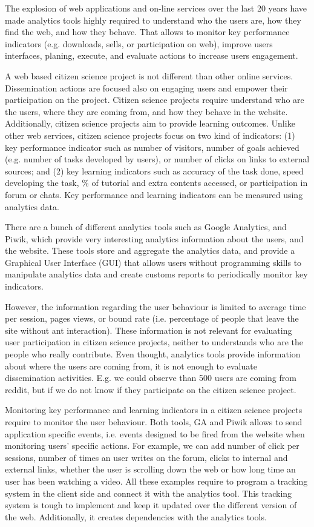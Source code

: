 \documentclass{article}
\begin{document}
The explosion of web applications and on-line services over the last 20 years have made analytics tools highly required to understand who the users are, how they find the web, and how they behave. That allows to monitor key performance indicators (e.g. downloads, sells, or participation on web), improve users interfaces, planing, execute, and evaluate actions to increase users engagement. 

A web based citizen science project is not  different than other online services. Dissemination actions are focused also on engaging users and empower their participation on the project. Citizen science projects require understand who are the users, where they are coming from, and how they behave in the website. Additionally, citizen science projects aim to provide learning outcomes. Unlike other web services, citizen science projects focus on two kind of indicators: (1) key performance indicator such as number of visitors, number of goals achieved (e.g. number of tasks developed by users), or number of clicks on links to external sources; and (2) key learning indicators such as accuracy of the task done, speed developing the task, \% of tutorial and extra contents accessed, or participation in forum or chats. Key performance and learning indicators can be measured using analytics data. 

There are a bunch of different analytics tools such as Google Analytics, and Piwik, which provide very interesting analytics information about the users, and the website. These tools store and aggregate the analytics data, and provide a Graphical User Interface (GUI) that allows users without programming skills to manipulate analytics data and create customs reports to periodically monitor key  indicators.  


However, the information regarding the user behaviour is limited to average time per session, pages views, or bound rate (i.e. percentage of people that leave the site without ant interaction). These information is not relevant for evaluating user participation in citizen science projects, neither to understands who are the people who really contribute. Even thought, analytics tools provide information about where the users are coming from, it is not enough to evaluate dissemination activities. E.g. we could observe than 500 users are coming from reddit, but if we do not know if they participate on the citizen science project. 


Monitoring key performance and learning indicators in a citizen science projects require to monitor the user behaviour.  Both tools, GA and Piwik allows to send application specific events, i.e. events designed to be fired from the website when monitoring users' specific actions. For example, we can add number of click per sessions, number of times an user writes on the forum, clicks to internal and external links, whether the user is scrolling down the web or how long time an user has been watching a video. All these examples require to program a tracking system in the client side and connect it with the analytics tool. This tracking system is tough to implement and keep it updated over the different version of the web. Additionally, it creates dependencies with the analytics tools.
\end{document}
